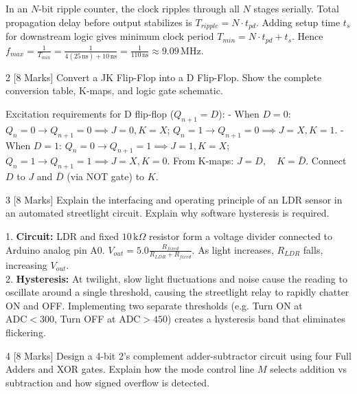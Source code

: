 \begin{solbox}
In an $N$-bit ripple counter, the clock ripples through all $N$ stages serially. Total propagation delay before output stabilizes is $T_{ripple} = N \cdot t_{pd}$. Adding setup time $t_s$ for downstream logic gives minimum clock period $T_{min} = N \cdot t_{pd} + t_s$. Hence $f_{max} = \frac{1}{T_{min}} = \frac{1}{4(25\,\text{ns}) + 10\,\text{ns}} = \frac{1}{110\,\text{ns}} \approx 9.09\,\text{MHz}$.
\end{solbox}

\begin{examqbox}{2 [8 Marks]}
Convert a JK Flip-Flop into a D Flip-Flop. Show the complete conversion table, K-maps, and logic gate schematic.
\end{examqbox}

\begin{solbox}
Excitation requirements for D flip-flop ($Q_{n+1} = D$):
- When $D=0$: $Q_n=0 \to Q_{n+1}=0 \implies J=0, K=X$; $Q_n=1 \to Q_{n+1}=0 \implies J=X, K=1$.
- When $D=1$: $Q_n=0 \to Q_{n+1}=1 \implies J=1, K=X$; $Q_n=1 \to Q_{n+1}=1 \implies J=X, K=0$.
From K-maps: $J = D, \quad K = \bar{D}$. Connect $D$ to $J$ and $\bar{D}$ (via NOT gate) to $K$.
\end{solbox}

\begin{examqbox}{3 [8 Marks]}
Explain the interfacing and operating principle of an LDR sensor in an automated streetlight circuit. Explain why software hysteresis is required.
\end{examqbox}

\begin{solbox}
1. \textbf{Circuit:} LDR and fixed $10\,\text{k}\Omega$ resistor form a voltage divider connected to Arduino analog pin A0. $V_{out} = 5.0\frac{R_{fixed}}{R_{LDR} + R_{fixed}}$. As light increases, $R_{LDR}$ falls, increasing $V_{out}$.\\
2. \textbf{Hysteresis:} At twilight, slow light fluctuations and noise cause the reading to oscillate around a single threshold, causing the streetlight relay to rapidly chatter ON and OFF. Implementing two separate thresholds (e.g. Turn ON at $\text{ADC} < 300$, Turn OFF at $\text{ADC} > 450$) creates a hysteresis band that eliminates flickering.
\end{solbox}

\begin{examqbox}{4 [8 Marks]}
Design a 4-bit 2's complement adder-subtractor circuit using four Full Adders and XOR gates. Explain how the mode control line $M$ selects addition vs subtraction and how signed overflow is detected.
\end{examqbox}

